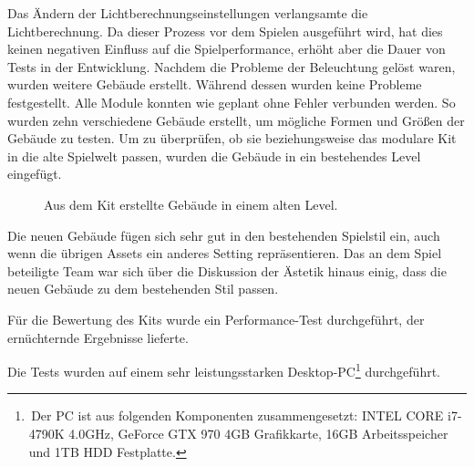 \vspace{-10.5pt}
Das Ändern der Lichtberechnungseinstellungen verlangsamte die Lichtberechnung. Da dieser Prozess vor dem Spielen ausgeführt wird, hat dies keinen negativen Einfluss auf die Spielperformance, erhöht aber die Dauer von Tests in der Entwicklung. Nachdem die Probleme der Beleuchtung gelöst waren, wurden weitere Gebäude erstellt.
\newpage
Während dessen wurden keine Probleme festgestellt. Alle Module konnten wie geplant ohne Fehler verbunden werden. So wurden zehn verschiedene Gebäude erstellt, um mögliche Formen und Größen der Gebäude zu testen. Um zu überprüfen, ob sie beziehungsweise das modulare Kit in die alte Spielwelt passen, wurden die Gebäude in ein bestehendes Level eingefügt.
\begin{figure}[H]
\centering
  \caption{Aus dem Kit erstellte Gebäude in einem alten Level.}
	\label{stilTest}
\end{figure}
\vspace{-10.5pt}
Die neuen Gebäude fügen sich sehr gut in den bestehenden Spielstil ein, auch wenn die übrigen Assets ein anderes Setting repräsentieren. Das an dem Spiel beteiligte Team war sich über die Diskussion der Ästetik hinaus einig, dass die neuen Gebäude zu dem bestehenden Stil passen.
\par
Für die Bewertung des Kits wurde ein Performance-Test durchgeführt, der ernüchternde Ergebnisse lieferte.
\par
Die Tests wurden auf einem sehr leistungsstarken Desktop-PC\footnote{\,Der PC ist aus folgenden Komponenten zusammengesetzt: INTEL CORE i7-4790K 4.0GHz, GeForce GTX 970 4GB Grafikkarte, 16GB Arbeitsspeicher und 1TB HDD Festplatte.} durchgeführt. 
